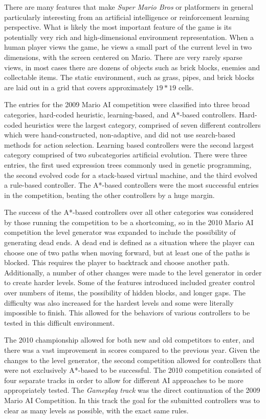 \documentclass[12pt]{article}
\begin{document}
\begin{multicols}{2}
There are many features that make \textit {Super Mario Bros} or platformers in general particularly interesting from 
an artificial intelligence or reinforcement learning perspective. What is likely the most important feature of the game 
is its potentially very rich and high-dimensional environment representation. When a human player views the 
game, he views a small part of the current level in two dimensions, with the screen centered on Mario. There are 
very rarely sparse views, in most cases there are dozens of objects such as brick blocks, enemies and collectable 
items. The static environment, such as grass, pipes, and brick blocks are laid out in a grid that covers 
approximately $19 * 19$ cells.

The entries for the 2009 Mario AI competition were classified into three broad categories, hard-coded heuristic, 
learning-based, and A*-based controllers. Hard-coded heuristics were the largest category, comprised of seven 
different controllers which were hand-constructed, non-adaptive, and did not use search-based methods for action 
selection. Learning based controllers were the second largest category comprised of two subcategories artificial 
evolution. There were three entries, the first used expression trees commonly used in genetic programming, the 
second evolved code for a stack-based virtual machine, and the third evolved a rule-based controller. The A*-based 
controllers were the most successful entries in the competition, beating the other controllers by a huge margin.

The success of the A*-based controllers over all other categories was considered by those running the competition 
to be a shortcoming, so in the 2010 Mario AI competition the level generator was expanded to include the possibility 
of generating dead ends. A dead end is defined as a situation where the player can choose one of two paths when 
moving forward, but at least one of the paths is blocked. This requires the player to backtrack and choose another 
path. Additionally, a number of other changes were made to the level generator in order to create harder levels. 
Some of the features introduced included greater control over numbers of items, the possibility of hidden blocks, and 
longer gaps. The difficulty was also increased for the hardest levels and some were literally impossible to finish. This 
allowed for the behaviors of various controllers to be tested in this difficult environment.

The 2010 championship allowed for both new and old competitors to enter, and there was a vast improvement in scores compared to the previous year. Given the changes to the level generator, the second competition allowed for controllers that were not exclusively A*-based to be successful. The 2010 competition consisted of four separate tracks in order to allow for different AI approaches to be more appropriately tested. The \textit {Gameplay track} was the direct continuation of the 2009 Mario AI Competition. In this track the goal for the submitted controllers was to clear as many levels as possible, with the exact same rules. 


\end{multicols}
\end{document}
